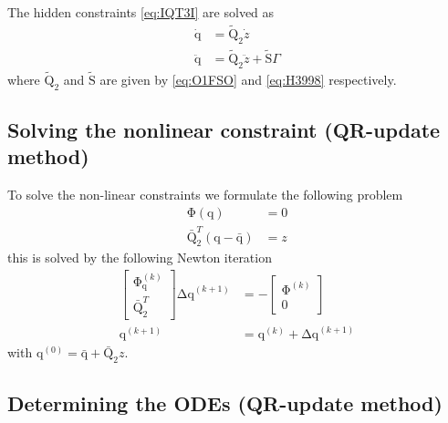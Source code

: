 \documentclass{scrartcl}
\newcommand\mMat[1]{\ensuremath{\boldsymbol{\mathrm{#1}}}}
\newcommand\mVec[1]{\ensuremath{\boldsymbol{\mathrm{#1}}}}
\newcommand\mOf[1]{\left({#1}\right)}
\begin{document}
The hidden constraints \eqref{eq:IQT3I} are solved as
\begin{align}
  \mVec{\dot q} &= \mMat{\tilde Q}_2 {\dot z}
  \\
  \mVec{\ddot q} &= \mMat{\tilde Q}_2 {\ddot z} + \mMat{\tilde S} \Gamma
\end{align}
where $\mMat{\tilde Q}_2$ and $\mMat{\tilde S}$ are given by \eqref{eq:O1FSO}
and \eqref{eq:H3998} respectively.

\subsection{Solving the nonlinear constraint (QR-update method)}

To solve the non-linear constraints we formulate the following problem
\begin{subequations}
\begin{align}
  \mMat{\Phi}\mOf{\mVec{q}} &= 0
  \\
  \mMat{\bar Q}_2^T \left(\mVec{q} - \mVec{\bar q}\right) &= z
\end{align}
\end{subequations}
this is solved by the following Newton iteration
\begin{subequations}
\begin{align}
  \begin{bmatrix}
    \mMat{\Phi}_{\mVec{q}}^{(k)} \\
    \mMat{\bar Q}_2^T
  \end{bmatrix}
  \mVec{\Delta q}^{(k+1)}
& = - \begin{bmatrix}
  \mVec{\Phi}^{(k)} \\
  0
\end{bmatrix}
\\
\mVec{q}^{(k+1)}
&= \mVec{q}^{(k)} + \mVec{\Delta q}^{(k+1)}
\end{align}
\end{subequations}
with $\mVec{q}^{(0)} = \mVec{\bar q} + \mMat{\bar Q}_2 z$.

\subsection{Determining the ODEs (QR-update method)}
\end{document}
